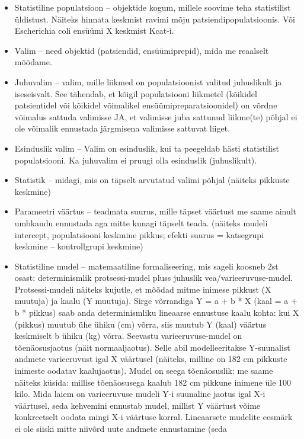 \documentclass[]{book}
\begin{document}
\begin{itemize}
\item
  Statistiline populatsioon -- objektide kogum, millele soovime teha
  statistilist üldistust. Näiteks hinnata keskmist ravimi mõju
  patsiendipopulatsioonis. Või Escherichia coli ensüümi X keskmist
  Kcat-i.
\item
  Valim -- need objektid (patsiendid, ensüümiprepid), mida me reaalselt
  mõõdame.
\item
  Juhuvalim -- valim, mille liikmed on populatsioonist valitud
  juhuslikult ja iseseisvalt. See tähendab, et kõigil populatsiooni
  liikmetel (kõikidel patsientidel või kõikidel võimalikel
  ensüümipreparatsioonidel) on võrdne võimalus sattuda valimisse JA, et
  valimisse juba sattunud liikme(te) põhjal ei ole võimalik ennustada
  järgmisena valimisse sattuvat liiget.
\item
  Esinduslik valim -- Valim on esinduslik, kui ta peegeldab hästi
  statistilist populatsiooni. Ka juhuvalim ei pruugi olla esinduslik
  (juhuslikult).
\item
  Statistik -- midagi, mis on täpselt arvutatud valimi põhjal (näiteks
  pikkuste keskmine)
\item
  Parameetri väärtus -- teadmata suurus, mille täpset väärtust me saame
  ainult umbkaudu ennustada aga mitte kunagi täpselt teada. (näiteks
  mudeli intercept, populatsiooni keskmine pikkus; efekti suurus =
  katsegrupi keskmine -- kontrollgrupi keskmine)
\item
  Statistiline mudel -- matemaatiline formaliseering, mis sageli koosneb
  2st osast: determinismlik protsessi-mudel pluss juhuslik
  vea/varieeruvuse-mudel. Protsessi-mudeli näiteks kujutle, et mõõdad
  mitme inimese pikkust (X muutuja) ja kaalu (Y muutuja). Sirge
  võrrandiga Y = a + b * X (kaal = a + b * pikkus) saab anda
  determinismliku lineaarse ennustuse kaalu kohta: kui X (pikkus) muutub
  ühe ühiku (cm) võrra, siis muutub Y (kaal) väärtus keskmiselt b ühiku
  (kg) võrra. Seevastu varieeruvuse-mudel on tõenäosusjaotus (näit
  normaaljaotus). Selle abil modelleeritakse Y-suunalist andmete
  varieeruvust igal X väärtusel (näiteks, milline on 182 cm pikkuste
  inimeste oodatav kaalujaotus). Mudel on seega tõenäosuslik: me saame
  näiteks küsida: millise tõenäosusega kaalub 182 cm pikkune inimene üle
  100 kilo. Mida laiem on varieeruvuse mudeli Y-i suunaline jaotus igal
  X-i väärtusel, seda kehvemini ennustab mudel, millist Y väärtust võime
  konkreetselt oodata mingi X-i väärtuse korral. Lineaarsete mudelite
  eesmärk ei ole siiski mitte niivõrd uute andmete ennustamine (seda

\end{itemize}
\end{document}
